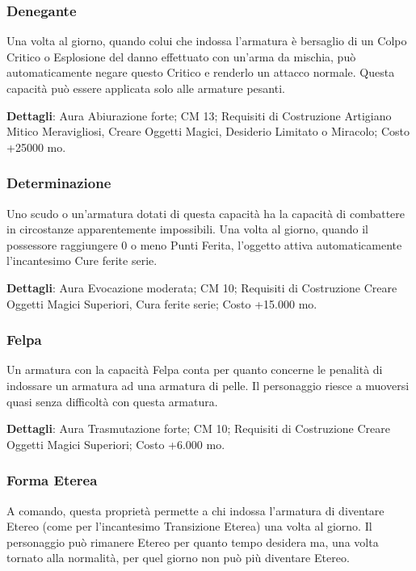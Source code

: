 \begin{multicols}{2}
\subsubsection{Denegante}

Una volta al giorno, quando colui che indossa l'armatura è bersaglio di un Colpo Critico o Esplosione del danno effettuato con un'arma da mischia, può automaticamente negare questo Critico e renderlo un attacco normale. Questa capacità può essere applicata solo alle armature pesanti.

\textbf{Dettagli}: Aura Abiurazione forte; CM 13; Requisiti di Costruzione Artigiano Mitico Meravigliosi, Creare Oggetti Magici, Desiderio Limitato o Miracolo; Costo +25000 mo.

\subsubsection{Determinazione}

Uno scudo o un'armatura dotati di questa capacità ha la capacità di combattere in circostanze apparentemente impossibili. Una volta al giorno, quando il possessore raggiungere 0 o meno Punti Ferita, l'oggetto attiva automaticamente l'incantesimo Cure ferite serie.

\textbf{Dettagli}: Aura Evocazione moderata; CM 10; Requisiti di Costruzione Creare Oggetti Magici Superiori, Cura ferite serie; Costo +15.000 mo.

\subsubsection{Felpa}

Un armatura con la capacità Felpa conta per quanto concerne le penalità di indossare un armatura ad una armatura di pelle. Il personaggio riesce a muoversi quasi senza difficoltà con questa armatura.

\textbf{Dettagli}: Aura Trasmutazione forte; CM 10; Requisiti di Costruzione Creare Oggetti Magici Superiori; Costo +6.000 mo.

\subsubsection{Forma Eterea}

A comando, questa proprietà permette a chi indossa l'armatura di diventare Etereo (come per l'incantesimo Transizione Eterea) una volta al giorno. Il personaggio può rimanere Etereo per quanto tempo desidera ma, una volta tornato alla normalità, per quel giorno non può più diventare Etereo.


\end{multicols}
